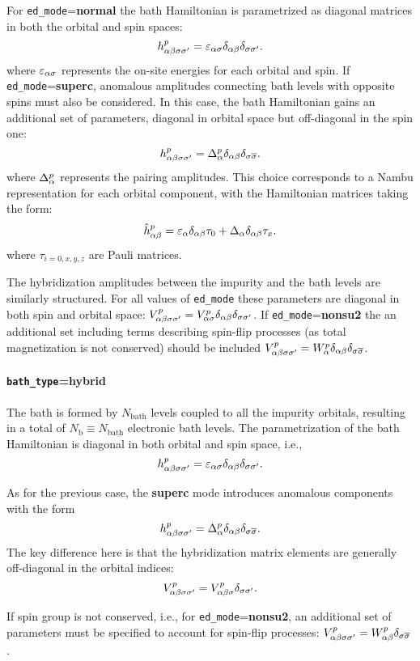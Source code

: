 \documentclass[edipack2.tex]{subfiles}
\begin{document}
For {\tt ed\_mode}={\bf normal} the bath Hamiltonian is parametrized
as diagonal matrices in both the orbital and spin spaces:
$$
h^p_{\alpha\beta\sigma\sigma'}=\varepsilon_{\alpha\sigma}\delta_{\alpha\beta}\delta_{\sigma\sigma'} .
$$
where $\varepsilon_{\alpha\sigma}$ represents  the on-site energies for each orbital and spin.
If {\tt ed\_mode}={\bf superc},  anomalous
amplitudes connecting bath levels with opposite spins must also be
considered. In this case, the bath Hamiltonian gains 
an additional set of parameters, diagonal in orbital space but
off-diagonal in the spin one:
$$
h^p_{\alpha\beta\sigma\sigma'}=\Delta^p_{\alpha}\delta_{\alpha\beta}\delta_{\sigma \overline{\sigma}} .
$$
where $\Delta^p_\alpha$ represents the pairing amplitudes. 
This choice corresponds to a Nambu representation for each orbital component,
with the Hamiltonian matrices taking the form:
$$
\hat{h}^p_{\alpha\beta} = \varepsilon_{\alpha}\delta_{\alpha\beta}\tau_0 +
\Delta_{\alpha}\delta_{\alpha\beta}\tau_x .
$$
where $\tau_{i=0,x,y,z}$ are Pauli matrices.

The hybridization amplitudes between the impurity and the bath levels
are similarly structured. For all values of {\tt ed\_mode} these
parameters are diagonal in both
spin and orbital space: $V^p_{\alpha\beta\sigma\sigma'}=V^p_{\alpha\sigma}\delta_{\alpha\beta}\delta_{\sigma\sigma'}$.
If {\tt ed\_mode}={\bf nonsu2} the an additional set including terms
describing spin-flip processes (as total magnetization is not
conserved) should be included $V^p_{\alpha\beta\sigma\sigma'} =
W^p_{\alpha}\delta_{\alpha\beta}\delta_{\sigma \overline{\sigma}}$. 



\paragraph{{\tt bath\_type}={\bf hybrid}}
The bath is formed by $N_\mathrm{bath}$ levels coupled to all the
impurity orbitals, resulting in a total of 
$N_\mathrm{b}\equiv N_\mathrm{bath}$ electronic bath levels. 
The parametrization of the bath Hamiltonian is 
diagonal in both orbital and spin space, i.e.,
$$
h^p_{\alpha\beta\sigma\sigma'}=\varepsilon_{\alpha\sigma}\delta_{\alpha\beta}\delta_{\sigma\sigma'}.
$$

As for the previous case, the {\bf superc} mode introduces anomalous
components with the form
$$
h^p_{\alpha\beta\sigma\sigma'}=\Delta^p_{\alpha}\delta_{\alpha\beta}\delta_{\sigma
  \overline{\sigma}}.
$$
The key difference here is that the hybridization matrix elements are
generally off-diagonal in the orbital indices:
$$
V^p_{\alpha\beta\sigma\sigma'}=V^p_{\alpha\beta\sigma}\delta_{\sigma\sigma'}.
$$

If spin group is not conserved, i.e., for {\tt ed\_mode}={\bf nonsu2}, an additional
set of parameters must be specified to account for spin-flip processes:
$V^p_{\alpha\beta\sigma\sigma'} = W^p_{\alpha\beta}\delta_{\sigma \overline{\sigma}}$. 
\end{document}
